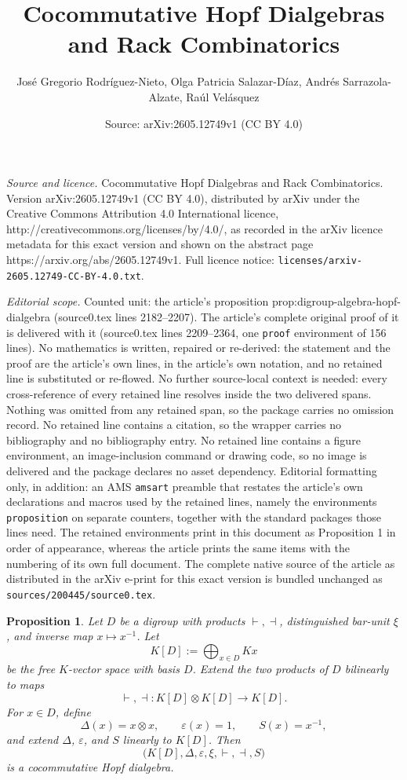 \documentclass[10pt,a4paper]{amsart}
\title{Cocommutative Hopf Dialgebras and Rack Combinatorics}
\author{Jos\'e Gregorio Rodr\'iguez-Nieto, Olga Patricia Salazar-D\'iaz, Andr\'es Sarrazola-Alzate, Ra\'ul Vel\'asquez}
\date{Source: arXiv:2605.12749v1 (CC BY 4.0)}
\newtheorem{proposition}{Proposition}
\begin{document}
\maketitle

\noindent\emph{Source and licence.} Cocommutative Hopf Dialgebras and Rack Combinatorics. Version arXiv:2605.12749v1 (CC BY 4.0), distributed by arXiv under the Creative Commons Attribution 4.0 International licence, http://creativecommons.org/licenses/by/4.0/, as recorded in the arXiv licence metadata for this exact version and shown on the abstract page https://arxiv.org/abs/2605.12749v1. Full licence notice: \texttt{licenses/arxiv-2605.12749-CC-BY-4.0.txt}.\par\smallskip

\noindent\textit{Editorial scope.} Counted unit: the article's proposition prop:digroup-algebra-hopf-dialgebra (source0.tex lines 2182--2207). The article's complete original proof of it is delivered with it (source0.tex lines 2209--2364, one \texttt{proof} environment of 156 lines). No mathematics is written, repaired or re-derived: the statement and the proof are the article's own lines, in the article's own notation, and no retained line is substituted or re-flowed.  No further source-local context is needed: every cross-reference of every retained line resolves inside the two delivered spans.  Nothing was omitted from any retained span, so the package carries no omission record.  No retained line contains a citation, so the wrapper carries no bibliography and no bibliography entry.  No retained line contains a figure environment, an image-inclusion command or drawing code, so no image is delivered and the package declares no asset dependency.  Editorial formatting only, in addition: an AMS \texttt{amsart} preamble that restates the article's own declarations and macros used by the retained lines, namely the environments \texttt{proposition} on separate counters, together with the standard packages those lines need.  The retained environments print in this document as Proposition 1 in order of appearance, whereas the article prints the same items with the numbering of its own full document.  The complete native source of the article as distributed in the arXiv e-print for this exact version is bundled unchanged as \texttt{sources/200445/source0.tex}.
	\begin{proposition}\label{prop:digroup-algebra-hopf-dialgebra}
		Let \(D\) be a digroup with products \(\vdash,\dashv\), distinguished
		bar-unit \(\xi\), and inverse map \(x\mapsto x^{-1}\). Let
		\[
		K[D]:=\bigoplus_{x\in D}Kx
		\]
		be the free \(K\)-vector space with basis \(D\). Extend the two products
		of \(D\) bilinearly to maps
		\[
		\vdash,\dashv:K[D]\otimes K[D]\longrightarrow K[D].
		\]
		For \(x\in D\), define
		\[
		\Delta(x)=x\otimes x,
		\qquad
		\varepsilon(x)=1,
		\qquad
		S(x)=x^{-1},
		\]
		and extend \(\Delta\), \(\varepsilon\), and \(S\) linearly to \(K[D]\).
		Then
		\[
		\bigl(K[D],\Delta,\varepsilon,\xi,\vdash,\dashv,S\bigr)
		\]
		is a cocommutative Hopf dialgebra.
	\end{proposition}
\end{document}
